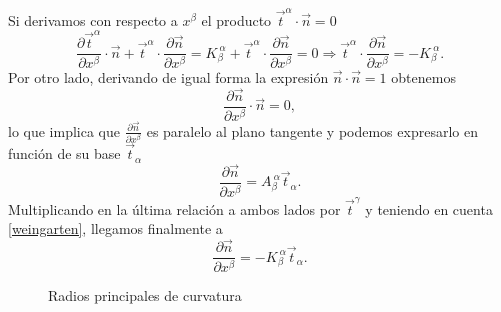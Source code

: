 Si derivamos con respecto a $x^{\beta}$ el producto $\vec{t}^{\alpha}\cdot\vec{n}=0$
\begin{equation}\label{weingarten}
\frac{\partial \vec{t}^{\alpha}}{\partial x^{\beta}}\cdot\vec{n}+
\vec{t}^{\alpha}\cdot\frac{\partial \vec{n}}{\partial x^{\beta}}=
K_{\beta}^{\ \alpha}+\vec{t}^{\alpha}\cdot\frac{\partial \vec{n}}{\partial x^{\beta}}=0
\Rightarrow \vec{t}^{\alpha}\cdot\frac{\partial \vec{n}}{\partial x^{\beta}}=-K_{\beta}^{\ \alpha}.
\end{equation}
Por otro lado, derivando de igual forma la expresión $\vec{n}\cdot\vec{n}=1$ obtenemos 
\begin{equation*}
\frac{\partial \vec{n}}{\partial x^{\beta} }\cdot \vec{n}=0,
\end{equation*}
lo que implica que $\frac{\partial \vec{n}}{\partial x^{\beta}}$ es paralelo
al plano tangente y podemos expresarlo en función de su base $\vec{t}_{\alpha}$
\begin{equation*}
\frac{\partial \vec{n}}{\partial x^{\beta}}=A_{\beta}^{\ \alpha}\vec{t}_{\alpha}.
\end{equation*}
Multiplicando en la última relación a ambos lados por $\vec{t}^{\gamma}$ y teniendo en cuenta
\eqref{weingarten}, llegamos finalmente a 
\begin{equation}\label{derivada_n}
\frac{\partial \vec{n}}{\partial x^{\beta}}=-K_{\beta}^{\ \alpha}\vec{t}_{\alpha}.
\end{equation}

\begin{figure}[h]
\centering
 \resizebox{\columnwidth}{!}{}
\caption{Radios principales de curvatura}\label{radios_curvatura-fig}
\end{figure}

